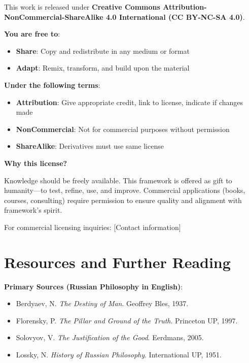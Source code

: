 \documentclass[11pt,a4paper]{article}
\theoremstyle{definition}
\theoremstyle{remark}
\begin{document}
\begin{enumerate}
\begin{protocol}
This work is released under \textbf{Creative Commons Attribution-NonCommercial-ShareAlike 4.0 International (CC BY-NC-SA 4.0)}.

\textbf{You are free to}:
\begin{itemize}
    \item \textbf{Share}: Copy and redistribute in any medium or format
    \item \textbf{Adapt}: Remix, transform, and build upon the material
\end{itemize}

\textbf{Under the following terms}:
\begin{itemize}
    \item \textbf{Attribution}: Give appropriate credit, link to license, indicate if changes made
    \item \textbf{NonCommercial}: Not for commercial purposes without permission
    \item \textbf{ShareAlike}: Derivatives must use same license
\end{itemize}

\textbf{Why this license?}

Knowledge should be freely available. This framework is offered as gift to humanity—to test, refine, use, and improve. Commercial applications (books, courses, consulting) require permission to ensure quality and alignment with framework's spirit.

For commercial licensing inquiries: [Contact information]

\vspace{2em}

\section*{Resources and Further Reading}

\textbf{Primary Sources (Russian Philosophy in English)}:
\begin{itemize}
    \item Berdyaev, N. \textit{The Destiny of Man}. Geoffrey Bles, 1937.
    \item Florensky, P. \textit{The Pillar and Ground of the Truth}. Princeton UP, 1997.
    \item Solovyov, V. \textit{The Justification of the Good}. Eerdmans, 2005.
    \item Lossky, N. \textit{History of Russian Philosophy}. International UP, 1951.
\end{itemize}


\end{protocol}
\end{enumerate}
\end{document}
